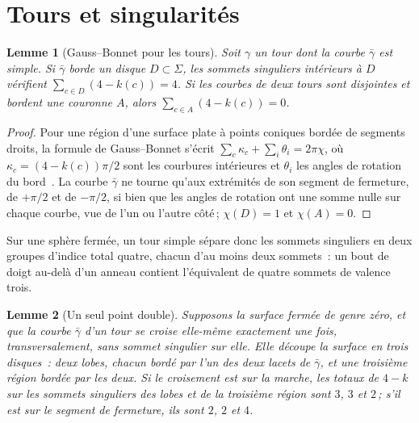 \documentclass[11pt,a4paper]{article}
\newtheorem{lemma}{Lemme}
\begin{document}
\section{Tours et singularités}\label{sec:holonomy}

\begin{lemma}[Gauss--Bonnet pour les tours]\label{lem:gauss}
Soit $\gamma$ un tour dont la courbe $\bar\gamma$ est simple. Si $\bar\gamma$
borde un disque $D \subset \Sigma$, les sommets singuliers intérieurs à $D$
vérifient $\sum_{c \in D} (4 - k(c)) = 4$. Si les courbes de deux tours sont
disjointes et bordent une couronne $A$, alors $\sum_{c \in A} (4 - k(c)) =
0$.
\end{lemma}

\begin{proof}
Pour une région d'une surface plate à points coniques bordée de segments
droits, la formule de Gauss--Bonnet s'écrit $\sum_c \kappa_c + \sum_i
\theta_i = 2\pi\chi$, où $\kappa_c = (4 - k(c))\pi/2$ sont les courbures
intérieures et $\theta_i$ les angles de rotation du
bord~\cite{bommes2013survey}. La courbe $\bar\gamma$ ne tourne qu'aux
extrémités de son segment de fermeture, de $+\pi/2$ et de $-\pi/2$, si bien
que les angles de rotation ont une somme nulle sur chaque courbe, vue de l'un
ou l'autre côté\,; $\chi(D) = 1$ et $\chi(A) = 0$.
\end{proof}

Sur une sphère fermée, un tour simple sépare donc les sommets singuliers en
deux groupes d'indice total quatre, chacun d'au moins deux sommets~: un bout
de doigt au-delà d'un anneau contient l'équivalent de quatre sommets de
valence trois.

\begin{lemma}[Un seul point double]\label{lem:eight}
Supposons la surface fermée de genre zéro, et que la courbe $\bar\gamma$ d'un
tour se croise elle-même exactement une fois, transversalement, sans sommet
singulier sur elle. Elle découpe la surface en trois disques~: deux
\emph{lobes}, chacun bordé par l'un des deux lacets de $\bar\gamma$, et une
troisième région bordée par les deux. Si le croisement est sur la marche, les
totaux de $4 - k$ sur les sommets singuliers des lobes et de la troisième
région sont $3$, $3$ et $2$\,; s'il est sur le segment de fermeture, ils sont
$2$, $2$ et $4$.
\end{lemma}
\end{document}

